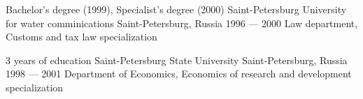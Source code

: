 

\begin{cventries}

  \cventry
    {Bachelor's degree (1999), Specialist's degree (2000)} %
    {Saint-Petersburg University for water comminications} %
    {Saint-Petersburg, Russia} %
    {1996 --- 2000} %
    {Law department, Customs and tax law specialization}

    \cventry
    {3 years of education}
    {Saint-Petersburg State University}
    {Saint-Petersburg, Russia}
    {1998 --- 2001}
    {Department of Economics, Economics of research and development specialization}

\end{cventries}
